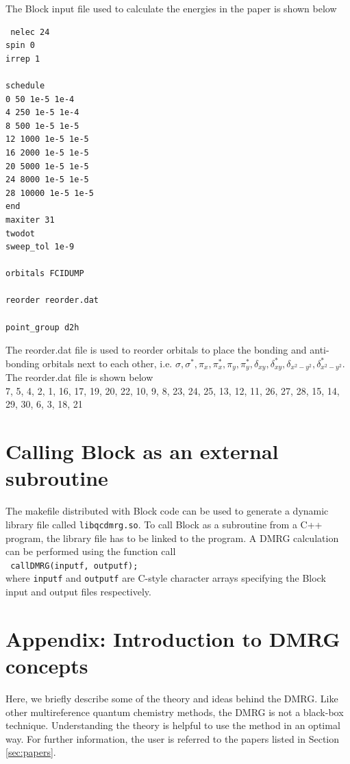 \documentclass[letterpaper,12pt,aps, pra]{revtex4-1}
\begin{document}
The Block input file used to calculate the energies in the paper is shown below
\begin{verbatim}
 nelec 24
spin 0
irrep 1

schedule
0 50 1e-5 1e-4
4 250 1e-5 1e-4
8 500 1e-5 1e-5
12 1000 1e-5 1e-5
16 2000 1e-5 1e-5
20 5000 1e-5 1e-5
24 8000 1e-5 1e-5
28 10000 1e-5 1e-5
end
maxiter 31
twodot
sweep_tol 1e-9

orbitals FCIDUMP

reorder reorder.dat

point_group d2h
\end{verbatim}

The reorder.dat file is used to reorder orbitals to place the bonding and anti-bonding orbitals next to each other, i.e. {$\sigma, \sigma^*, \pi_x, \pi_x^*, \pi_y, \pi_y^*, \delta_{xy}, \delta_{xy}^*, \delta_{x^2-y^2}, \delta_{x^2-y^2}^*$}. The reorder.dat file is shown below\\

 7,  5,  4,  2,  1,
16, 17, 19, 20, 22,
10,  9,  8, 23, 24,
25, 13, 12, 11, 26,
27, 28, 15, 14, 29,
30,  6,  3, 18, 21            

\section{Calling Block as an external subroutine}
The makefile distributed with Block code can be used to generate a dynamic library file called \texttt{libqcdmrg.so}. To call Block as a subroutine from a C++ program, the library file has to be linked to the program. A DMRG calculation can be performed using the function call\\
\texttt{
callDMRG(inputf, outputf);\\
} 
where \texttt{inputf} and \texttt{outputf} are C-style character arrays specifying the Block input and output files respectively.

\section{Appendix: Introduction to DMRG concepts}\label{sec:appendix1}

Here, we briefly describe some of the theory and ideas behind the DMRG. 
Like other multireference quantum chemistry methods, the DMRG
is not a black-box technique. Understanding the theory is helpful
to use the method in an optimal way. For further information, the
 user is referred to the papers listed in Section \ref{sec:papers}.
\end{document}
